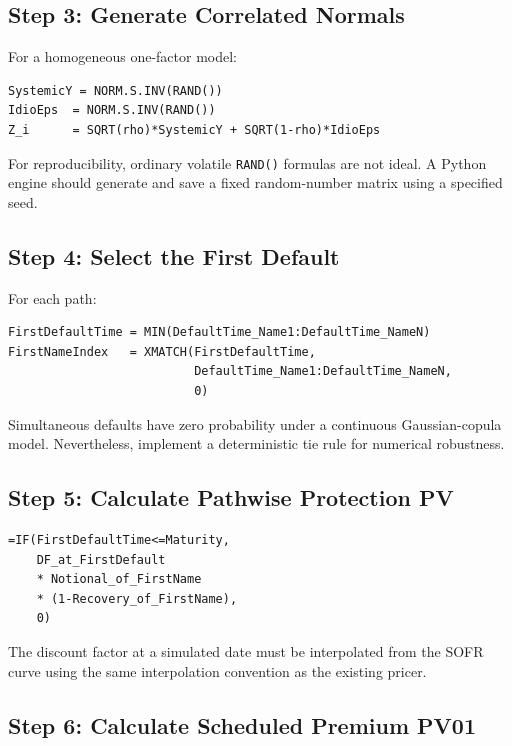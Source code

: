 \documentclass[11pt,a4paper]{article}
\begin{document}
\subsection{Step 3: Generate Correlated Normals}

For a homogeneous one-factor model:

\begin{lstlisting}
SystemicY = NORM.S.INV(RAND())
IdioEps  = NORM.S.INV(RAND())
Z_i      = SQRT(rho)*SystemicY + SQRT(1-rho)*IdioEps
\end{lstlisting}

For reproducibility, ordinary volatile \texttt{RAND()} formulas are not ideal. A Python engine should generate and save a fixed random-number matrix using a specified seed.

\subsection{Step 4: Select the First Default}

For each path:

\begin{lstlisting}
FirstDefaultTime = MIN(DefaultTime_Name1:DefaultTime_NameN)
FirstNameIndex   = XMATCH(FirstDefaultTime,
                          DefaultTime_Name1:DefaultTime_NameN,
                          0)
\end{lstlisting}

Simultaneous defaults have zero probability under a continuous Gaussian-copula model. Nevertheless, implement a deterministic tie rule for numerical robustness.

\subsection{Step 5: Calculate Pathwise Protection PV}

\begin{lstlisting}
=IF(FirstDefaultTime<=Maturity,
    DF_at_FirstDefault
    * Notional_of_FirstName
    * (1-Recovery_of_FirstName),
    0)
\end{lstlisting}

The discount factor at a simulated date must be interpolated from the SOFR curve using the same interpolation convention as the existing pricer.

\subsection{Step 6: Calculate Scheduled Premium PV01}
\end{document}
